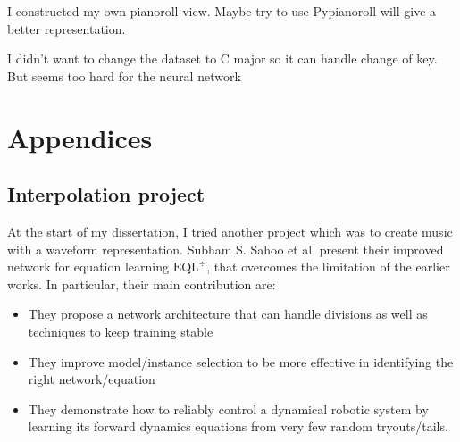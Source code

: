\documentclass[12pt]{report}
\begin{document}
I constructed my own pianoroll view.
Maybe try to use Pypianoroll will give a better representation.


I didn't want to change the dataset to C major so it can handle change of key. But seems too hard for the neural network
\newpage





\newpage

\chapter*{Appendices}
\appendix

\section{Interpolation project}

At the start of my dissertation, I tried another project which was to create music with a waveform representation.
Subham S. Sahoo et al. \cite{sahoo_learning_2018} present their improved network for equation learning $\text{EQL}^\div$, that overcomes the limitation of the earlier works. In particular, their main contribution are:
\begin{itemize}
    \item They propose a network architecture that can handle divisions as well as techniques to keep training stable
    \item They improve model/instance selection to be more effective in identifying the right network/equation
    \item They demonstrate how to reliably control a dynamical robotic system by learning its forward dynamics equations from very few random tryouts/tails.
\end{itemize}
\end{document}
